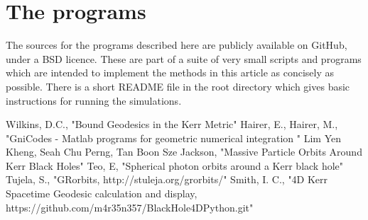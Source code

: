 \documentclass[11pt]{article}
\begin{document}
\section{The programs}

The sources for the programs \cite{m4r35n357} described here are publicly available on GitHub, under a BSD licence.  These are part of a suite of very small scripts and programs which are intended to implement the methods in this article as concisely as possible.  There is a short README file in the root directory which gives basic instructions for running the simulations.

\begin{thebibliography}{1}
 Wilkins, D.C., "Bound Geodesics in the Kerr Metric"
  Hairer, E., Hairer, M., "GniCodes - Matlab programs for geometric numerical integration "
 Lim Yen Kheng, Seah Chu Perng, Tan Boon Sze Jackson, "Massive Particle Orbits Around Kerr Black Holes"
 Teo, E, "Spherical photon orbits around a Kerr black hole"
 Tujela, S., "GRorbits, http://stuleja.org/grorbits/"
 Smith, I. C., "4D Kerr Spacetime Geodesic calculation and display, https://github.com/m4r35n357/BlackHole4DPython.git"
\end{thebibliography}
\end{document}
